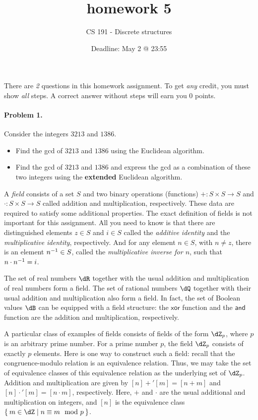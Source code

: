 \documentclass[article,10pt,oneside]{memoir}
\title{homework 5}
\author{CS 191 - Discrete structures}
\date{Deadline: May 2 @ 23:55}
\begin{document}
\maketitle

There are \emph{2} questions in this homework assignment.
To get \emph{any} credit, you must show \emph{all} steps.
A correct answer without steps will earn you 0 points.

\paragraph{Problem 1.} Consider the integers $3213$ and $1386$.
\begin{itemize}
\item Find the gcd of $3213$ and $1386$ using the Euclidean algorithm.
\item Find the gcd of $3213$ and $1386$ and express the gcd as a combination of these two integers using the \textbf{extended} Euclidean algorithm.
\end{itemize}
\framebox[\textwidth]{\rule{0pt}{\textheight-\pagetotal}}

\clearpage

A \emph{field} consists of a set $S$ and two binary operations (functions) $+ : S \times S \to S$ and $\cdot : S \times S \to S$ called addition and multiplication, respectively.
These data are required to satisfy some additional properties.
The exact definition of fields is not important for this assignment.
All you need to know is that there are distinguished elements $z \in S$ and $i \in S$ called the \emph{additive identity} and the \emph{multiplicative identity}, respectively.
And for any element $n \in S$, with $n \neq z$, there is an element $n^{-1} \in S$, called the \emph{multiplicative inverse for $n$}, such that $n \cdot n^{-1} = i$.

The set of real numbers $\dR$ together with the usual addition and multiplication of real numbers form a field.
The set of rational numbers $\dQ$ together with their usual addition and multiplication also form a field.
In fact, the set of Boolean values $\dB$ can be equipped with a field structure: the $\mathsf{xor}$ function and the $\mathsf{and}$ function are the addition and multiplication, respectively.

A particular class of examples of fields consists of fields of the form $\dZ_{p}$, where $p$ is an arbitrary prime number.
For a prime number $p$, the field $\dZ_{p}$ consists of exactly $p$ elements.
Here is one way to construct such a field: recall that the congruence-modulo relation is an equivalence relation.
Thus, we may take the set of equivalence classes of this equivalence relation as the underlying set of $\dZ_{p}$.
Addition and multiplication are given by $[n] +' [m] = [n + m]$ and $[n] \cdot' [m] = [n \cdot m]$, respectively.
Here, $+$ and $\cdot$ are the usual additional and multiplication on integers, and $[n]$ is the equivalence class $\Set{m \in \dZ \mid n \equiv m \mod p}$.
\end{document}
